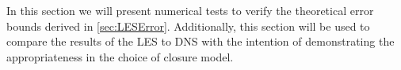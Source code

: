 In this section we will present numerical tests to verify the theoretical error bounds derived in
\autoref{sec:LESError}. Additionally, this section will be used to compare the results of the
LES to DNS with the intention of demonstrating the appropriateness in the choice of closure model.
